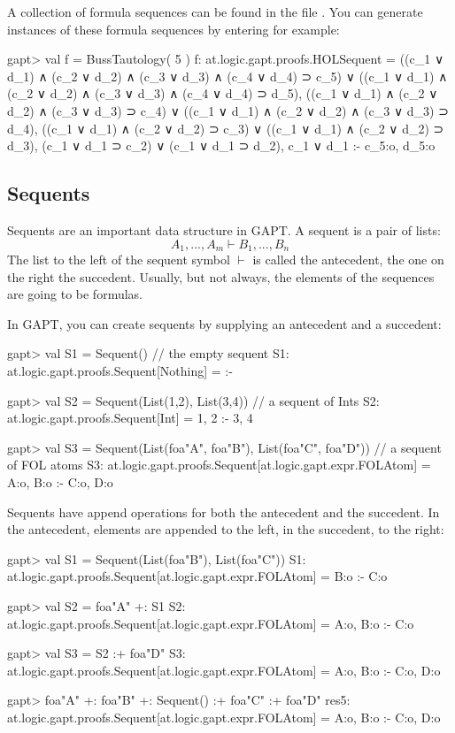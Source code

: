 \documentclass[a4paper,11pt]{article}
\newcommand{\cli}[1]{{\ttfamily {#1}}}
\begin{document}
A collection of formula sequences can be found in the file \cli{examples/FormulaSequences.scala}.
You can generate instances of these formula sequences by entering for example:
\begin{clilisting}
gapt> val f = BussTautology( 5 )
f: at.logic.gapt.proofs.HOLSequent =
((c_1 ∨ d_1) ∧ (c_2 ∨ d_2) ∧ (c_3 ∨ d_3) ∧ (c_4 ∨ d_4) ⊃ c_5) ∨
  ((c_1 ∨ d_1) ∧ (c_2 ∨ d_2) ∧ (c_3 ∨ d_3) ∧ (c_4 ∨ d_4) ⊃ d_5),
((c_1 ∨ d_1) ∧ (c_2 ∨ d_2) ∧ (c_3 ∨ d_3) ⊃ c_4) ∨
  ((c_1 ∨ d_1) ∧ (c_2 ∨ d_2) ∧ (c_3 ∨ d_3) ⊃ d_4),
((c_1 ∨ d_1) ∧ (c_2 ∨ d_2) ⊃ c_3) ∨ ((c_1 ∨ d_1) ∧ (c_2 ∨ d_2) ⊃ d_3),
(c_1 ∨ d_1 ⊃ c_2) ∨ (c_1 ∨ d_1 ⊃ d_2),
c_1 ∨ d_1
:-
c_5:o,
d_5:o

\end{clilisting}

\subsection{Sequents}
Sequents are an important data structure in GAPT. A sequent is a pair of lists:
\begin{equation*}
 A_1,...,A_m \vdash B_1,...,B_n
\end{equation*}
The list to the left of the sequent symbol $\vdash$ is called the antecedent, the
one on the right the succedent. Usually, but not always, the elements of the sequences are going to be formulas.

In GAPT, you can create sequents by supplying an antecedent and a succedent:

\begin{clilisting}
gapt> val S1 = Sequent() // the empty sequent
S1: at.logic.gapt.proofs.Sequent[Nothing] =  :-

gapt> val S2 = Sequent(List(1,2), List(3,4)) // a sequent of Ints
S2: at.logic.gapt.proofs.Sequent[Int] = 1, 2 :- 3, 4

gapt> val S3 = Sequent(List(foa"A", foa"B"), List(foa"C", foa"D")) // a sequent of FOL atoms
S3: at.logic.gapt.proofs.Sequent[at.logic.gapt.expr.FOLAtom] = A:o, B:o :- C:o, D:o

\end{clilisting}

Sequents have append operations for both the antecedent and the succedent. In the antecedent,
elements are appended to the left, in the succedent, to the right:

\begin{clilisting}
gapt> val S1 = Sequent(List(foa"B"), List(foa"C"))
S1: at.logic.gapt.proofs.Sequent[at.logic.gapt.expr.FOLAtom] = B:o :- C:o

gapt> val S2 = foa"A" +: S1
S2: at.logic.gapt.proofs.Sequent[at.logic.gapt.expr.FOLAtom] = A:o, B:o :- C:o

gapt> val S3 = S2 :+ foa"D"
S3: at.logic.gapt.proofs.Sequent[at.logic.gapt.expr.FOLAtom] = A:o, B:o :- C:o, D:o

gapt> foa"A" +: foa"B" +: Sequent() :+ foa"C" :+ foa"D"
res5: at.logic.gapt.proofs.Sequent[at.logic.gapt.expr.FOLAtom] = A:o, B:o :- C:o, D:o

\end{clilisting}
\end{document}
